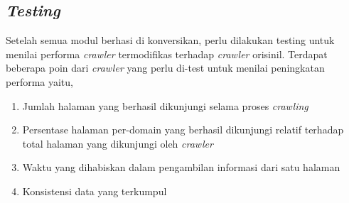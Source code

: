\subsection{\emph{Testing}}

Setelah semua modul berhasi di konversikan, perlu dilakukan testing untuk menilai performa \emph{crawler} termodifikas terhadap \emph{crawler} orisinil. Terdapat beberapa poin dari \emph{crawler} yang perlu di-test untuk menilai peningkatan performa yaitu,

\begin{enumerate}
  \item Jumlah halaman yang berhasil dikunjungi selama proses \emph{crawling}
  \item Persentase halaman per-domain yang berhasil dikunjungi relatif terhadap total halaman yang dikunjungi oleh \emph{crawler}
  \item Waktu yang dihabiskan dalam pengambilan informasi dari satu halaman
  \item Konsistensi data yang terkumpul
\end{enumerate}
